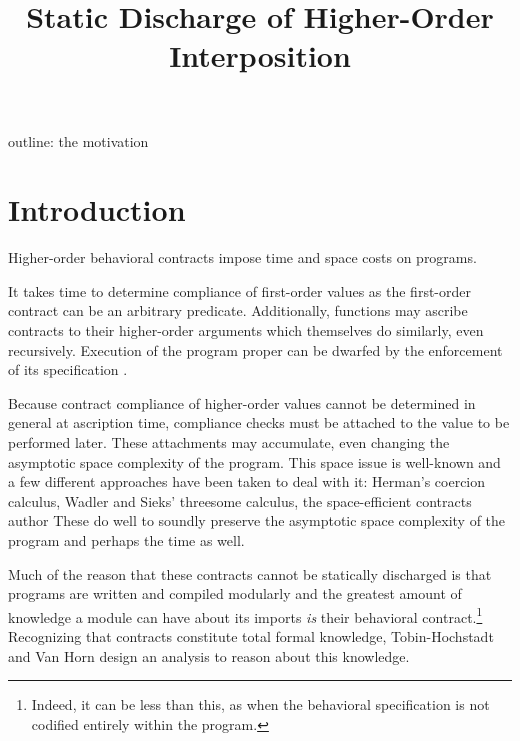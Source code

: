\documentclass{sigplanconf}
\title{Static Discharge of Higher-Order Interposition}
\begin{document}
\maketitle





outline:
the motivation

\cite{findler2002contracts}
\cite{herman2010space}
\cite{plt-tr1}
\cite{siek2009exploring}
\cite{siek2010threesomes}
\cite{strickland2012chaperones}
\cite{tobin2012higher}
\cite{wadler2009well}

\section{Introduction}

Higher-order behavioral contracts impose time and space costs on programs.

It takes time to determine compliance of first-order values as the first-order contract can be an arbitrary predicate.
Additionally, functions may ascribe contracts to their higher-order arguments which themselves do similarly, even recursively.
Execution of the program proper can be dwarfed by the enforcement of its specification \cite{strickland2012chaperones}.

Because contract compliance of higher-order values cannot be determined in general at ascription time, compliance checks must be attached to the value to be performed later.
These attachments may accumulate, even changing the asymptotic space complexity of the program.
This space issue is well-known and a few different approaches have been taken to deal with it:
Herman's coercion calculus, Wadler and Sieks' threesome calculus, the space-efficient contracts author
These do well to soundly preserve the asymptotic space complexity of the program and perhaps the time as well.

Much of the reason that these contracts cannot be statically discharged is that programs are written and compiled modularly and the greatest amount of knowledge a module can have about its imports \emph{is} their behavioral contract.\footnote{Indeed, it can be less than this, as when the behavioral specification is not codified entirely within the program.} Recognizing that contracts constitute total formal knowledge, Tobin-Hochstadt and Van Horn \cite{tobin2012higher} design an analysis to reason about this knowledge.
\end{document}
